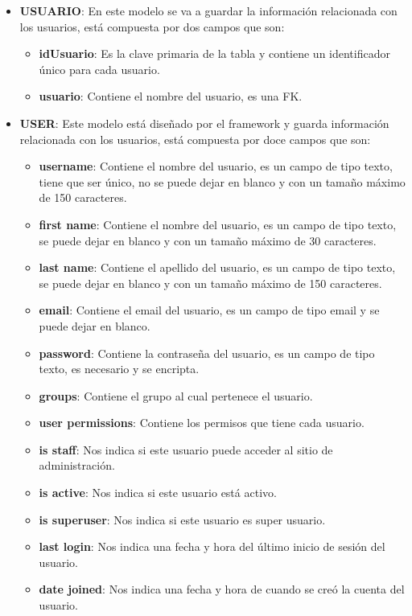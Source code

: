 
\begin{itemize}
	\item \textbf{USUARIO}: En este modelo se va a guardar la información relacionada con los usuarios, está compuesta por dos campos que son:
		\begin{itemize}
		\item \textbf{idUsuario}: Es la clave primaria de la tabla y contiene un identificador único para cada usuario.
		\item \textbf{usuario}: Contiene el nombre del usuario, es una FK. 
	\end{itemize}
\end{itemize}

\begin{itemize}
	\item \textbf{USER}: Este modelo está diseñado por el framework y guarda información relacionada con los usuarios, está compuesta por doce campos que son:
	\begin{itemize}
		\item \textbf{username}: Contiene el nombre del usuario, es un campo de tipo texto, tiene que ser único, no se puede dejar en blanco y con un tamaño máximo de 150 caracteres.
		\item \textbf{first name}: Contiene el nombre del usuario, es un campo de tipo texto, se puede dejar en blanco y con un tamaño máximo de 30 caracteres.
		\item \textbf{last name}: Contiene el apellido del usuario, es un campo de tipo texto, se puede dejar en blanco y con un tamaño máximo de 150 caracteres.  
		\item \textbf{email}: Contiene el email del usuario, es un campo de tipo email y se puede dejar en blanco.
		\item \textbf{password}: Contiene la contraseña del usuario, es un campo de tipo texto, es necesario y se encripta.
		\item \textbf{groups}: Contiene el grupo al cual pertenece el usuario. 
		\item \textbf{user permissions}: Contiene los permisos que tiene cada usuario.
		\item \textbf{is staff}: Nos indica si este usuario puede acceder al sitio de administración.
		\item \textbf{is active}: Nos indica si este usuario está activo.  
		\item \textbf{is superuser}: Nos indica si este usuario es super usuario.
		\item \textbf{last login}: Nos indica una fecha y hora del último inicio de sesión del usuario.
		\item \textbf{date joined}: Nos indica una fecha y hora de cuando se creó la cuenta del usuario. 
	\end{itemize}
	
\end{itemize}

